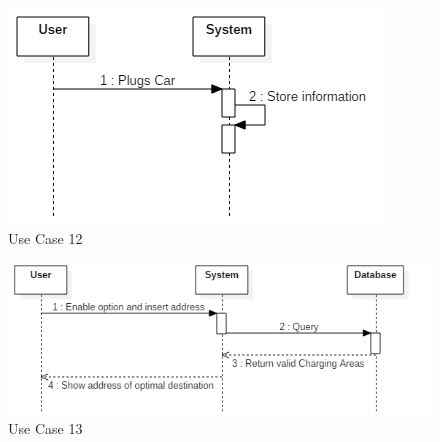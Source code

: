 \FloatBarrier
\begin{figure}[h]
\centering
\includegraphics[width=\linewidth,keepaspectratio]{../Diagrams/SD/UC_12.png}
\caption{Use Case 12}
\end{figure}
\FloatBarrier
\begin{figure}[h]
\centering
\includegraphics[width=\linewidth,keepaspectratio]{../Diagrams/SD/UC_13.png}
\caption{Use Case 13}
\end{figure}
\FloatBarrier
\clearpage